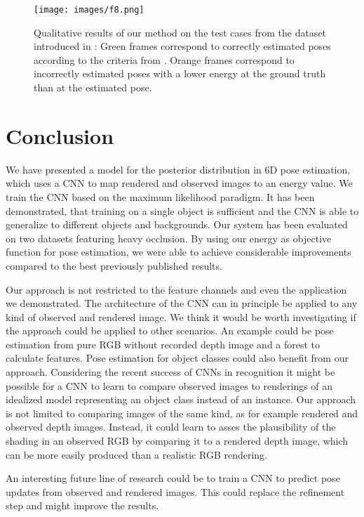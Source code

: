 \documentclass[10pt,letterpaper]{article}
\begin{document}
\begin{figure}[!ht]
\begin{center}
\texttt{[image: images/f8.png]}
\end{center}
   \caption{
Qualitative results of our method on the test cases from the dataset introduced in \cite{krull2014}: Green frames correspond to correctly estimated poses according to the criteria from \cite{hinterstoisser2012accv}. Orange frames correspond to incorrectly estimated poses with a lower energy at the ground truth than at the estimated pose.}
\label{fig:pose-accv-results}
\end{figure}


\section{Conclusion}
\label{sec:con}

We have presented a model for the posterior distribution in 6D pose estimation, which uses a CNN to map rendered and observed images to an energy value. We train the CNN based on the maximum likelihood paradigm. It has been demonstrated, that training on a single object is sufficient and the CNN is able to generalize to different objects and backgrounds. Our system has been evaluated on two datasets featuring heavy occlusion. By using our energy as objective function for pose estimation, we were able to achieve considerable improvements compared to the best previously published results.

Our approach is not restricted to the feature channels  and even the application we demonstrated. The architecture of the CNN can in principle be applied to any kind of observed and rendered image. We think it would be worth investigating if the approach could be applied to other scenarios. An example could be pose estimation from pure RGB without recorded depth image and a forest to calculate features. Pose estimation for object classes could also benefit from our approach. Considering the recent success of CNNs in recognition  \cite{agrawal_nn_2014,oquab_cnn_2014} it might be possible for a CNN to learn to compare observed images to renderings of an idealized model representing an object class instead of an instance. Our approach is not limited to comparing images of the same kind, as for example rendered and observed depth images. Instead, it could learn to asses the plausibility of the shading in an observed RGB by comparing it to a rendered depth image, which can be more easily produced than a realistic RGB rendering.

An interesting future line of research could be to train a CNN to predict pose updates from observed and rendered images. This could replace the refinement step and might improve the results.
\newpage{\small


}
\end{document}
